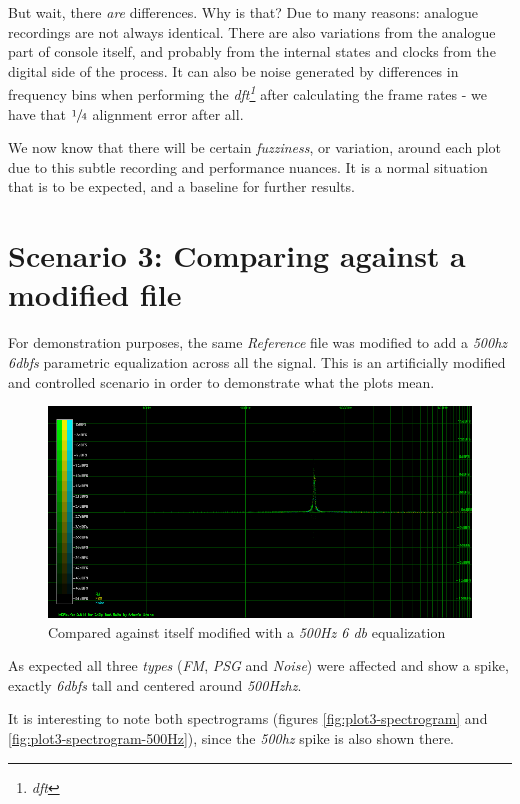 \documentclass[10pt,a4paper]{report}
\newcommand{\define}[1]{\textit{\acrshort{#1}\footnote{\textit{\acrlong{#1}}}}}
\newcommand{\fhz}[1]{\textit{#1\acrshort{hz}}}
\newcommand{\db}[1]{\textit{#1\acrshort{dbfs}}}
\begin{document}
But wait, there \textit{are} differences. Why is that? Due to many reasons: analogue recordings are not always identical. There are also variations from the analogue part of console itself, and probably from the internal states and clocks from the digital side of the process. It can also be noise generated by differences in frequency bins when performing the \define{dft} after calculating the frame rates - we have that $\sfrac{1}{4}$ alignment error after all.

We now know that there will be certain \textit{fuzziness}, or variation, around each plot due to this subtle recording and performance nuances. It is a normal situation that is to be expected, and a baseline for further results.

\section{Scenario 3: Comparing against a modified file}
\label{scenario3}

For demonstration purposes, the same \textit{Reference} file was modified to add a \fhz{500} \db{6} parametric equalization across all the signal. This is an artificially modified and controlled scenario in order to demonstrate what the plots mean.

\begin{figure}[H]
	\centering
	\includegraphics[width=1.0\linewidth]{images/interpretation/Plot3-Modified.png}
	\caption[1kHz modified]{Compared against itself modified with a \textit{500Hz 6 db} equalization}
	\label{fig:plot3-modified}
\end{figure}

As expected all three \textit{types} (\textit{FM}, \textit{PSG} and \textit{Noise}) were affected and show a spike, exactly \db{6} tall and centered around \fhz{500Hz}.

It is interesting to note both spectrograms (figures \ref{fig:plot3-spectrogram} and \ref{fig:plot3-spectrogram-500Hz}), since the \fhz{500} spike is also shown there.
\end{document}
